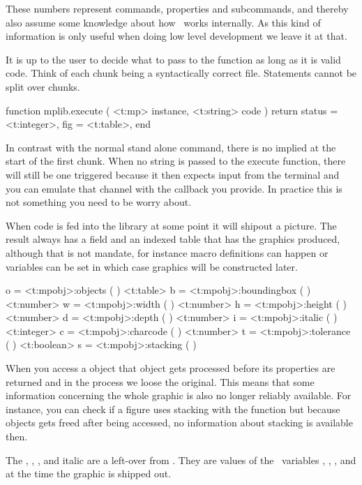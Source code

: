 These numbers represent commands, properties and subcommands, and thereby also
assume some knowledge about how \METAPOST\ works internally. As this kind of
information is only useful when doing low level development we leave it at that.

\stopsection

\startsubsection[title=Processing]

It is up to the user to decide what to pass to the  function as
long as it is valid code. Think of each chunk being a syntactically correct file.
Statements cannot be split over chunks.

\starttyping[option=LUA]
function mplib.execute ( <t:mp> instance, <t:string> code )
    return {
        status = <t:integer>,
        fig    = <t:table>,
    }
end
\stoptyping

In contrast with the normal stand alone  command, there is no
implied  at the start of the first chunk. When no string is passed
to the execute function, there will still be one triggered because it then
expects input from the terminal and you can emulate that channel with the
callback you provide. In practice this is not something you need to be worry
about.

When code is fed into the library at some point it will shipout a picture. The
result always has a  field and an indexed  table that
has the graphics produced, although that is not mandate, for instance macro
definitions can happen or variables can be set in which case graphics will be
constructed later.

 o = <t:mpobj>:objects     ( )
<t:table>    b = <t:mpobj>:boundingbox ( )
<t:number>   w = <t:mpobj>:width       ( )
<t:number>   h = <t:mpobj>:height      ( )
<t:number>   d = <t:mpobj>:depth       ( )
<t:number>   i = <t:mpobj>:italic      ( )
<t:integer>  c = <t:mpobj>:charcode    ( )
<t:number>   t = <t:mpobj>:tolerance   ( )
<t:boolean>  s = <t:mpobj>:stacking    ( )
\stoptyping

When you access a object that object gets processed before its properties are
returned and in the process we loose the original. This means that some
information concerning the whole graphic is also no longer reliably available.
For instance, you can check if a figure uses stacking with the 
function but because objects gets freed after being accessed, no information
about stacking is available then.

The , , ,  and \type
{italic} are a left-over from \METAFONT. They are values of the \METAPOST\
variables , , \typ
[option=MP] {fontcharht}, \typ [option=MP] {fontchardp} and \typ [option=MP]
{fontcharit} at the time the graphic is shipped out.

